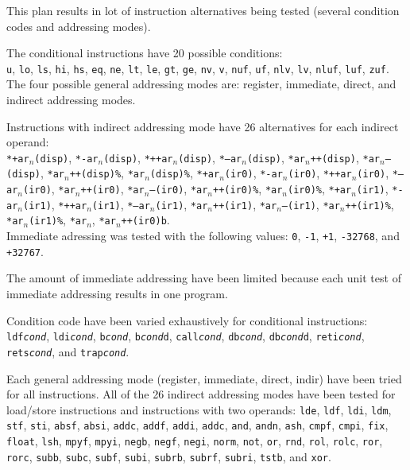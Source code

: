 This plan results in lot of instruction alternatives being tested (several condition codes and addressing modes).

\noindent The conditional instructions have 20 possible conditions:\\
\texttt{u}, \texttt{lo}, \texttt{ls}, \texttt{hi}, \texttt{hs}, \texttt{eq}, \texttt{ne}, \texttt{lt}, \texttt{le}, \texttt{gt}, \texttt{ge}, \texttt{nv}, \texttt{v}, \texttt{nuf}, \texttt{uf}, \texttt{nlv}, \texttt{lv}, \texttt{nluf}, \texttt{luf}, \texttt{zuf}.\\

\noindent The four possible general addressing modes are: register, immediate, direct, and indirect addressing modes.

\noindent Instructions with indirect addressing mode have 26 alternatives for each indirect operand:\\
\texttt{*+ar$_n$(disp)}, \texttt{*-ar$_n$(disp)}, \texttt{*++ar$_n$(disp)}, \texttt{*--ar$_n$(disp)}, \texttt{*ar$_n$++(disp)}, \texttt{*ar$_n$--(disp)}, \texttt{*ar$_n$++(disp)\%}, \texttt{*ar$_n$(disp)\%}, \texttt{*+ar$_n$(ir0)}, \texttt{*-ar$_n$(ir0)}, \texttt{*++ar$_n$(ir0)}, \texttt{*--ar$_n$(ir0)}, \texttt{*ar$_n$++(ir0)}, \texttt{*ar$_n$--(ir0)}, \texttt{*ar$_n$++(ir0)\%}, \texttt{*ar$_n$(ir0)\%}, \texttt{*+ar$_n$(ir1)}, \texttt{*-ar$_n$(ir1)}, \texttt{*++ar$_n$(ir1)}, \texttt{*--ar$_n$(ir1)}, \texttt{*ar$_n$++(ir1)}, \texttt{*ar$_n$--(ir1)}, \texttt{*ar$_n$++(ir1)\%}, \texttt{*ar$_n$(ir1)\%}, \texttt{*ar$_n$}, \texttt{*ar$_n$++(ir0)b}.\\

\noindent Immediate adressing was tested with the following values: \texttt{0}, \texttt{-1}, \texttt{+1}, \texttt{-32768}, and \texttt{+32767}.

\noindent The amount of immediate addressing have been limited because each unit test of immediate addressing results in one program.

Condition code have been varied exhaustively for conditional instructions: \texttt{ldf\textit{cond}}, \texttt{ldi\textit{cond}}, \texttt{b\textit{cond}}, \texttt{b\textit{cond}d}, \texttt{call\textit{cond}}, \texttt{db\textit{cond}}, \texttt{db\textit{cond}d}, \texttt{reti\textit{cond}}, \texttt{rets\textit{cond}}, and \texttt{trap\textit{cond}}.

Each general addressing mode (register, immediate, direct, indir) have been tried for all instructions.
All of the 26 indirect addressing modes have been tested for load/store instructions and instructions with two operands: \texttt{lde}, \texttt{ldf}, \texttt{ldi}, \texttt{ldm}, \texttt{stf}, \texttt{sti}, \texttt{absf}, \texttt{absi}, \texttt{addc}, \texttt{addf}, \texttt{addi}, \texttt{addc}, \texttt{and}, \texttt{andn}, \texttt{ash}, \texttt{cmpf}, \texttt{cmpi}, \texttt{fix}, \texttt{float}, \texttt{lsh}, \texttt{mpyf}, \texttt{mpyi}, \texttt{negb}, \texttt{negf}, \texttt{negi}, \texttt{norm}, \texttt{not}, \texttt{or}, \texttt{rnd}, \texttt{rol}, \texttt{rolc}, \texttt{ror}, \texttt{rorc}, \texttt{subb}, \texttt{subc}, \texttt{subf}, \texttt{subi}, \texttt{subrb}, \texttt{subrf}, \texttt{subri}, \texttt{tstb},  and \texttt{xor}.

